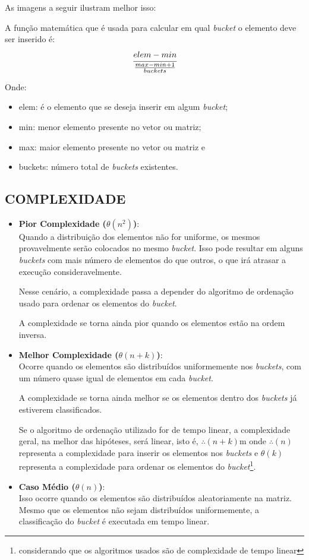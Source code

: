 		As imagens a seguir ilustram melhor isso:
		
		
		A função matemática que é usada para calcular em qual \textit{bucket} o elemento deve ser inserido é:
		$$\cfrac{elem - min}{\frac{max - min + 1}{buckets}}$$
		
		Onde:
		\begin{itemize}
			\item elem: é o elemento que se deseja inserir em algum \textit{bucket};
			\item min: menor elemento presente no vetor ou matriz;
			\item max: maior elemento presente no vetor ou matriz e
			\item buckets: número total de \textit{buckets} existentes.
		\end{itemize}
		
	\subsection{\normalsize COMPLEXIDADE}\label{complex}
		\begin{itemize}
			\item \textbf{Pior Complexidade ($\theta(n^{2})$)}:\\
				Quando a distribuição dos elementos não for uniforme, os mesmos provavelmente serão colocados no mesmo \textit{bucket}. Isso pode resultar em alguns \textit{buckets} com mais número de elementos do que outros, o que irá atrasar a execução consideravelmente.
				
				Nesse cenário, a complexidade passa a depender do algoritmo de ordenação usado para ordenar os elementos do \textit{bucket}.
				
				A complexidade se torna ainda pior quando os elementos estão na ordem inversa.
			
			\item \textbf{Melhor Complexidade ($\theta(n + k)$)}:\\
				Ocorre quando os elementos são distribuídos uniformemente nos \textit{buckets}, com um número quase igual de elementos em cada \textit{bucket}.
				
				A complexidade se torna ainda melhor se os elementos dentro dos \textit{buckets} já estiverem classificados.

				Se o algoritmo de ordenação utilizado for de tempo linear, a complexidade geral, na melhor das hipóteses, será linear, isto é, $\therefore(n + k)$m onde $\therefore(n)$ representa a complexidade para inserir os elementos nos \textit{buckets} e $\theta(k)$ representa a complexidade para ordenar os elementos do \textit{bucket}\footnote{considerando que os algoritmos usados são de complexidade de tempo linear}.
				
			\item \textbf{Caso Médio ($\theta(n)$)}:\\
				Isso ocorre quando os elementos são distribuídos aleatoriamente na matriz. Mesmo que os elementos não sejam distribuídos uniformemente, a classificação do \textit{bucket} é executada em tempo linear.
		\end{itemize}